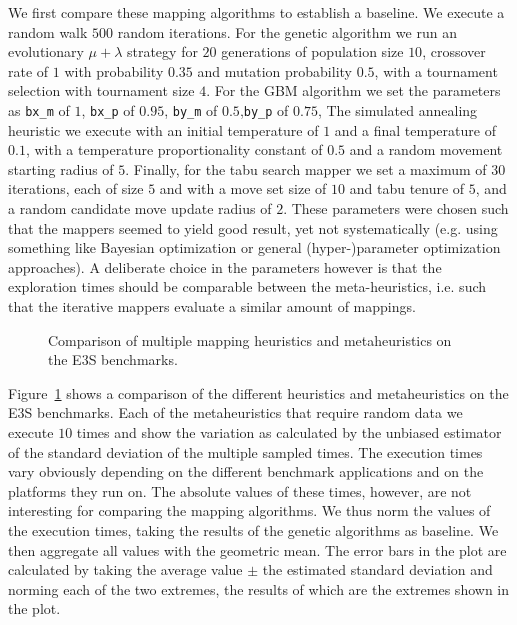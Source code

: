 We first compare these mapping algorithms to establish a baseline. 
We execute a random walk $500$ random iterations.
For the genetic algorithm we run an evolutionary $\mu + \lambda$ strategy for $20$ generations of population size $10$, crossover rate of $1$ with probability $0.35$ and mutation probability $0.5$, with a tournament selection with tournament size $4$.
For the \ac{GBM} algorithm we set the parameters as \texttt{bx\_m} of $1$, \texttt{bx\_p} of $0.95$, \texttt{by\_m} of $0.5$,\texttt{by\_p} of $0.75$, 
The simulated annealing heuristic we execute with an initial temperature of $1$ and a final temperature of $0.1$, with a temperature proportionality constant of $0.5$  and a random movement starting radius of $5$.
Finally, for the tabu search mapper we set a maximum of $30$ iterations, each of size $5$ and with a move set size of $10$ and tabu tenure of $5$, and a random candidate move update radius of $2$.
These parameters were chosen such that the mappers seemed to yield good result, yet not systematically (e.g. using something like Bayesian optimization or general (hyper-)parameter optimization approaches).
A deliberate choice in the parameters however is that the exploration times should be comparable between the meta-heuristics, i.e. such that the iterative mappers evaluate a similar amount of mappings.

\begin{figure}[h]
	\centering
   \resizebox{0.95\textwidth}{!}{}
	\caption{Comparison of multiple mapping heuristics and metaheuristics on the \ac{E3S} benchmarks.}
	\label{fig:heuristics_vs_metaheuristics}
\end{figure}

Figure~\ref{fig:heuristics_vs_metaheuristics} shows a comparison of the different heuristics and metaheuristics on the \ac{E3S} benchmarks.
Each of the metaheuristics that require random data we execute $10$ times and show the variation as calculated by the unbiased estimator of the standard deviation of the multiple sampled times.
The execution times vary obviously depending on the different benchmark applications and on the platforms they run on.
The absolute values of these times, however, are not interesting for comparing the mapping algorithms.
We thus norm the values of the execution times, taking the results of the genetic algorithms as baseline.
We then aggregate all values with the geometric mean.
The error bars in the plot are calculated by taking the average value $\pm$ the estimated standard deviation and norming each of the two extremes, the results of which are the extremes shown in the plot.


